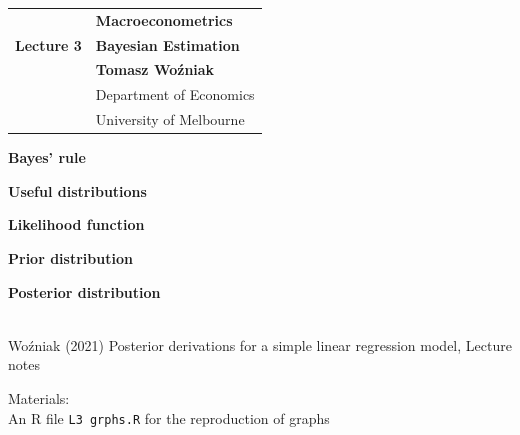 \documentclass[notes,blackandwhite,mathsans]{beamer}
\begin{document}







{
\begin{frame}

\vspace{1cm}
\begin{tabular}{rl}
&\textbf{\LARGE\color{mcxs2} Macroeconometrics}\\[8ex]
\textbf{\Large\color{mcxs2} Lecture 3}&\textbf{\Large\color{mcxs3}Bayesian Estimation}\\[19ex]
&\textbf{\color{mcxs2} Tomasz Wo\'zniak}\\[1ex]
&{\small\color{mcxs3} Department of Economics}\\
&{\small\color{mcxs3}University of Melbourne}
\end{tabular}

\end{frame}
}



{
\begin{frame}

\vspace{0.5cm} \textbf{\color{mcxs3}Bayes' rule}

\bigskip\textbf{\color{mcxs2}Useful distributions}

\bigskip\textbf{\color{mcxs2}Likelihood function}

\bigskip\textbf{\color{mcxs2}Prior distribution}

\bigskip\textbf{\color{mcxs2}Posterior distribution}



 \\ \footnotesize
{\color{mcxs2}Wo\'zniak (2021) Posterior derivations for a simple linear regression model, Lecture notes}\\

\bigskip\normalsize{\color{mcxs5}Materials:}\\ \footnotesize
{\color{mcxs2}An R file} \texttt{\color{mcxs5}L3 grphs.R} {\color{mcxs2}for the reproduction of graphs}\\

\end{frame}
}
\end{document}
